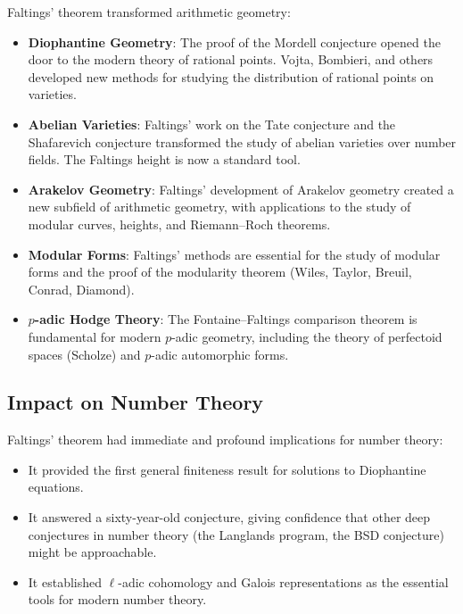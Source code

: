 Faltings' theorem transformed arithmetic geometry:

\begin{itemize}
\item \textbf{Diophantine Geometry}: The proof of the Mordell conjecture opened the door to the modern theory of rational points. Vojta, Bombieri, and others developed new methods for studying the distribution of rational points on varieties.

\item \textbf{Abelian Varieties}: Faltings' work on the Tate conjecture and the Shafarevich conjecture transformed the study of abelian varieties over number fields. The Faltings height is now a standard tool.

\item \textbf{Arakelov Geometry}: Faltings' development of Arakelov geometry created a new subfield of arithmetic geometry, with applications to the study of modular curves, heights, and Riemann--Roch theorems.

\item \textbf{Modular Forms}: Faltings' methods are essential for the study of modular forms and the proof of the modularity theorem (Wiles, Taylor, Breuil, Conrad, Diamond).

\item \textbf{$p$-adic Hodge Theory}: The Fontaine--Faltings comparison theorem is fundamental for modern $p$-adic geometry, including the theory of perfectoid spaces (Scholze) and $p$-adic automorphic forms.
\end{itemize}

\subsection{Impact on Number Theory}

Faltings' theorem had immediate and profound implications for number theory:
\begin{itemize}
\item It provided the first general finiteness result for solutions to Diophantine equations.
\item It answered a sixty-year-old conjecture, giving confidence that other deep conjectures in number theory (the Langlands program, the BSD conjecture) might be approachable.
\item It established $\ell$-adic cohomology and Galois representations as the essential tools for modern number theory.
\end{itemize}

